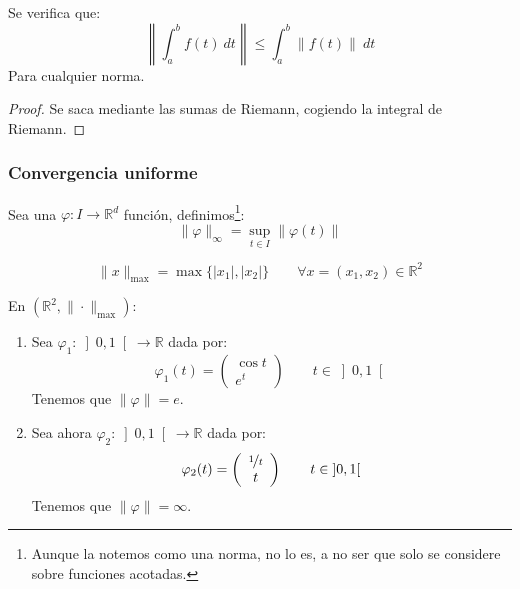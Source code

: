 \begin{prop}
    Se verifica que:
    \begin{equation*}
        \left\|\int_{a}^{b} f(t)~dt \right\| \leq \int_{a}^{b} \|f(t)\|~dt 
    \end{equation*}
    Para cualquier norma.
    \begin{proof}
        Se saca mediante las sumas de Riemann, cogiendo la integral de Riemann.
    \end{proof}
\end{prop}

\subsubsection{Convergencia uniforme}
Sea una $\varphi:I\rightarrow\mathbb{R}^d$ función, definimos\footnote{Aunque la notemos como una norma, no lo es, a no ser que solo se considere sobre funciones acotadas.}:
\begin{equation*}
    \|\varphi\|_\infty = \sup_{t\in I}\|\varphi(t)\|
\end{equation*}

\begin{definicion}
    \begin{equation*}
        \|x\|_{\max} = \max\{|x_1|,|x_2|\} \qquad \forall x=(x_1,x_2)\in \mathbb{R}^2
    \end{equation*}
\end{definicion}

\begin{ejemplo}
    En $(\mathbb{R}^2, \|\cdot \|_{\max})$:
    \begin{enumerate}
        \item Sea $\varphi_1:\left]0,1\right[\rightarrow\mathbb{R}$ dada por:
            \begin{equation*}
                \varphi_1(t) = \left(\begin{array}{c}
                    \cos t \\
                    e^t
                \end{array}\right) \qquad t\in \left]0,1\right[
            \end{equation*}
            Tenemos que $\|\varphi\| = e$.
        \item Sea ahora $\varphi_2:\left]0,1\right[\rightarrow\mathbb{R}$ dada por:
            \begin{equation*}
                \varphi_2(t) = \left(\begin{array}{c}
                        \nicefrac{1}{t} \\
                        t
                \end{array}\right) \qquad t\in \left]0,1\right[
            \end{equation*}
            Tenemos que $\|\varphi\| = \infty$.
    \end{enumerate}
\end{ejemplo}

